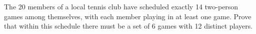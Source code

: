 The 20 members of a local tennis club have scheduled exactly 14 two-person games among themselves, with each member playing in at least one game. Prove that within this schedule there must be a set of 6 games with 12 distinct players.